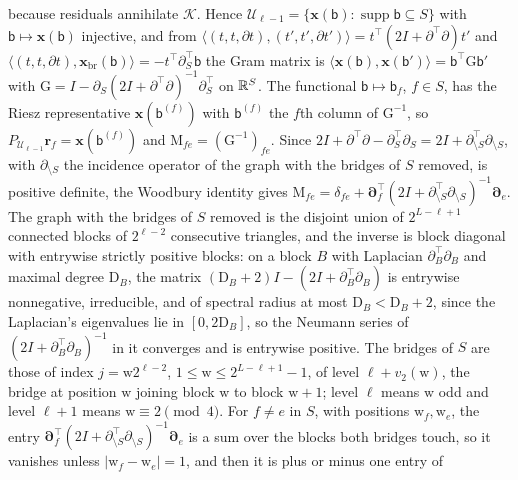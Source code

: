 because residuals annihilate \(\mathcal K\). Hence
\(\mathcal U_{\ell-1}=\{\mathbf x(\mathsf b):\operatorname{supp}\mathsf b\subseteq S\}\)
with \(\mathsf b\mapsto\mathbf x(\mathsf b)\) injective, and from
\(\langle(t,t,\partial t),(t',t',\partial t')\rangle=t^\top(2I+\partial^\top\partial)t'\)
and
\(\langle(t,t,\partial t),\mathbf x_{\mathrm{br}}(\mathsf b)\rangle=-t^\top\partial_S^\top\mathsf b\)
the Gram matrix is
\(\langle\mathbf x(\mathsf b),\mathbf x(\mathsf b')\rangle=\mathsf b^\top\mathrm G\mathsf b'\)
with \(\mathrm G=I-\partial_S(2I+\partial^\top\partial)^{-1}\partial_S^\top\)
on \(\mathbb R^S\). The functional \(\mathsf b\mapsto\mathsf b_f\), \(f\in S\), has
the Riesz representative \(\mathbf x(\mathsf b^{(f)})\) with
\(\mathsf b^{(f)}\) the \(f\)th column of \(\mathrm G^{-1}\), so
\(P_{\mathcal U_{\ell-1}}\mathbf r_f=\mathbf x(\mathsf b^{(f)})\) and
\(\mathrm M_{fe}=(\mathrm G^{-1})_{fe}\). Since
\(2I+\partial^\top\partial-\partial_S^\top\partial_S=2I+\partial_{\setminus S}^\top\partial_{\setminus S}\),
with \(\partial_{\setminus S}\) the incidence operator of the graph with the
bridges of \(S\) removed, is positive definite, the Woodbury identity gives
\(\mathrm M_{fe}=\delta_{fe}+\boldsymbol\partial_f^\top(2I+\partial_{\setminus S}^\top\partial_{\setminus S})^{-1}\boldsymbol\partial_e\).
The graph with the bridges of \(S\) removed is the disjoint union of \(2^{L-\ell+1}\)
connected blocks of \(2^{\ell-2}\) consecutive triangles, and the inverse is
block diagonal with entrywise strictly positive blocks: on a block \(B\) with
Laplacian \(\partial_B^\top\partial_B\) and maximal degree \(\mathrm D_B\),
the matrix \((\mathrm D_B+2)I-(2I+\partial_B^\top\partial_B)\) is entrywise
nonnegative, irreducible, and of spectral radius at most
\(\mathrm D_B<\mathrm D_B+2\), since the Laplacian's eigenvalues lie in
\([0,2\mathrm D_B]\), so the Neumann series of
\((2I+\partial_B^\top\partial_B)^{-1}\) in it converges and is entrywise
positive. The bridges of \(S\) are those of index \(j=\mathrm w2^{\ell-2}\),
\(1\le\mathrm w\le2^{L-\ell+1}-1\), of level \(\ell+v_2(\mathrm w)\), the
bridge at position \(\mathrm w\) joining block \(\mathrm w\) to block
\(\mathrm w+1\); level \(\ell\) means \(\mathrm w\) odd and level
\(\ell+1\) means \(\mathrm w\equiv2\pmod4\). For \(f\ne e\) in \(S\), with
positions \(\mathrm w_f,\mathrm w_e\), the entry
\(\boldsymbol\partial_f^\top(2I+\partial_{\setminus S}^\top\partial_{\setminus S})^{-1}\boldsymbol\partial_e\)
is a sum over the blocks both bridges touch, so it vanishes unless
\(|\mathrm w_f-\mathrm w_e|=1\), and then it is plus or minus one entry of
